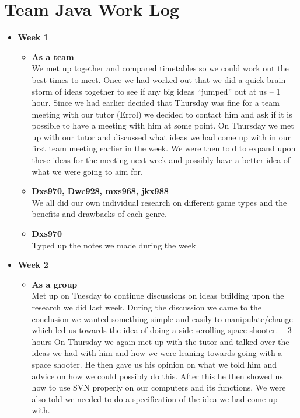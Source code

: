 \section{Team Java Work Log}
\label{app:worklog}
\begin{itemize}
\item \textbf{Week 1}
  \begin{itemize}
  \item \textbf{As a team} \\We met up together and compared
    timetables so we could work out the best times to meet. Once we
    had worked out that we did a quick brain storm of ideas together
    to see if any big ideas “jumped” out at us – 1 hour.  Since we had
    earlier decided that Thursday was fine for a team meeting with our
    tutor (Errol) we decided to contact him and ask if it is possible
    to have a meeting with him at some point.  On Thursday we met up
    with our tutor and discussed what ideas we had come up with in our
    first team meeting earlier in the week. We were then told to
    expand upon these ideas for the meeting next week and possibly
    have a better idea of what we were going to aim for.
  \item \textbf{Dxs970, Dwc928, mxs968, jkx988} \\We all did our own
    individual research on different game types and the benefits and
    drawbacks of each genre.
  \item \textbf{Dxs970} \\Typed up the notes we made during the week
  \end{itemize}
\item \textbf{Week 2}
  \begin{itemize}
  \item \textbf{As a group}\\
    Met up on Tuesday to continue discussions on ideas building upon
    the research we did last week. During the discussion we came to
    the conclusion we wanted something simple and easily to
    manipulate/change which led us towards the idea of doing a side
    scrolling space shooter. – 3 hours On Thursday we again met up
    with the tutor and talked over the ideas we had with him and how
    we were leaning towards going with a space shooter. He then gave
    us his opinion on what we told him and advice on how we could
    possibly do this. After this he then showed us how to use SVN
    properly on our computers and its functions.  We were also told we
    needed to do a specification of the idea we had come up with.

\end{itemize}
\end{itemize}

